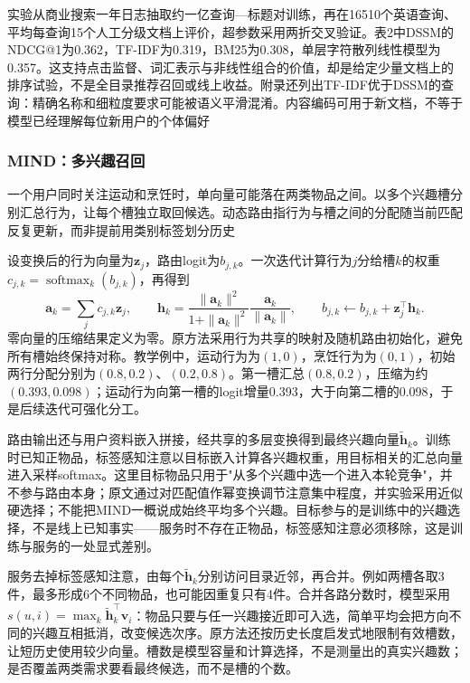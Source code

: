 实验从商业搜索一年日志抽取约一亿查询—标题对训练，再在16510个英语查询、平均每查询15个人工分级文档上评价，超参数采用两折交叉验证。表2中DSSM的NDCG@1为0.362，TF-IDF为0.319，BM25为0.308，单层字符散列线性模型为0.357。这支持点击监督、词汇表示与非线性组合的价值，却是给定少量文档上的排序试验，不是全目录推荐召回或线上收益。附录还列出TF-IDF优于DSSM的查询：精确名称和细粒度要求可能被语义平滑混淆。内容编码可用于新文档，不等于模型已经理解每位新用户的个体偏好

\Needspace{90mm}
\subsubsection{MIND：多兴趣召回}
\label{sec:rs-mind}

一个用户同时关注运动和烹饪时，单向量可能落在两类物品之间。以多个兴趣槽分别汇总行为，让每个槽独立取回候选。动态路由指行为与槽之间的分配随当前匹配反复更新，而非提前用类别标签划分历史

设变换后的行为向量为$\bm z_j$，路由logit为$b_{j,k}$。一次迭代计算行为$j$分给槽$k$的权重$c_{j,k}=\operatorname{softmax}_k(b_{j,k})$，再得到
\begin{equation}
 \bm a_k=\sum_j c_{j,k}\bm z_j,\qquad
 \bm h_k=\frac{\|\bm a_k\|^2}{1+\|\bm a_k\|^2}
                  \frac{\bm a_k}{\|\bm a_k\|},\qquad
 b_{j,k}\leftarrow b_{j,k}+\bm z_j^\top\bm h_k.
 \label{eq:rs-mind-routing}
\end{equation}
零向量的压缩结果定义为零。原方法采用行为共享的映射及随机路由初始化，避免所有槽始终保持对称。教学例中，运动行为为$(1,0)$，烹饪行为为$(0,1)$，初始两行分配分别为$(0.8,0.2)$、$(0.2,0.8)$。第一槽汇总$(0.8,0.2)$，压缩为约$(0.393,0.098)$；运动行为向第一槽的logit增量0.393，大于向第二槽的0.098，于是后续迭代可强化分工。

路由输出还与用户资料嵌入拼接，经共享的多层变换得到最终兴趣向量$\widetilde{\bm h}_k$。训练时已知正物品，标签感知注意以目标嵌入计算各兴趣权重，用目标相关的汇总向量进入采样softmax。这里目标物品只用于"从多个兴趣中选一个进入本轮竞争"，并不参与路由本身；原文通过对匹配值作幂变换调节注意集中程度，并实验采用近似硬选择；不能把MIND一概说成始终平均多个兴趣。目标参与的是训练中的兴趣选择，不是线上已知事实——服务时不存在正物品，标签感知注意必须移除，这是训练与服务的一处显式差别。

服务去掉标签感知注意，由每个$\widetilde{\bm h}_k$分别访问目录近邻，再合并。例如两槽各取3件，最多形成6个不同物品，也可能因重复只有4件。合并各路分数时，模型采用$s(u,i)=\max_k\widetilde{\bm h}_k^\top\bm v_i$：物品只要与任一兴趣接近即可入选，简单平均会把方向不同的兴趣互相抵消，改变候选次序。原方法还按历史长度启发式地限制有效槽数，让短历史使用较少向量。槽数是模型容量和计算选择，不是测量出的真实兴趣数；是否覆盖两类需求要看最终候选，而不是槽的个数。

